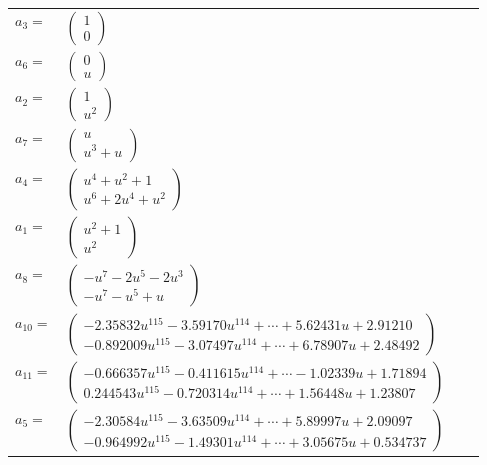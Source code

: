 \documentclass[1p]{elsarticle_modified}
\theoremstyle{definition}
\begin{document}
\begin{tabular}{m{7pt} m{180pt} m{7pt} m{180pt} }
\flushright $a_{3}=$&$\begin{pmatrix}1\\0\end{pmatrix}$ \\
\flushright $a_{6}=$&$\begin{pmatrix}0\\u\end{pmatrix}$ \\
\flushright $a_{2}=$&$\begin{pmatrix}1\\u^2\end{pmatrix}$ \\
\flushright $a_{7}=$&$\begin{pmatrix}u\\u^3+u\end{pmatrix}$ \\
\flushright $a_{4}=$&$\begin{pmatrix}u^4+u^2+1\\u^6+2 u^4+u^2\end{pmatrix}$ \\
\flushright $a_{1}=$&$\begin{pmatrix}u^2+1\\u^2\end{pmatrix}$ \\
\flushright $a_{8}=$&$\begin{pmatrix}- u^7-2 u^5-2 u^3\\- u^7- u^5+u\end{pmatrix}$ \\
\flushright $a_{10}=$&$\begin{pmatrix}-2.35832 u^{115}-3.59170 u^{114}+\cdots+5.62431 u+2.91210\\-0.892009 u^{115}-3.07497 u^{114}+\cdots+6.78907 u+2.48492\end{pmatrix}$ \\
\flushright $a_{11}=$&$\begin{pmatrix}-0.666357 u^{115}-0.411615 u^{114}+\cdots-1.02339 u+1.71894\\0.244543 u^{115}-0.720314 u^{114}+\cdots+1.56448 u+1.23807\end{pmatrix}$ \\
\flushright $a_{5}=$&$\begin{pmatrix}-2.30584 u^{115}-3.63509 u^{114}+\cdots+5.89997 u+2.09097\\-0.964992 u^{115}-1.49301 u^{114}+\cdots+3.05675 u+0.534737\end{pmatrix}$ \\

\end{tabular}
\end{document}
